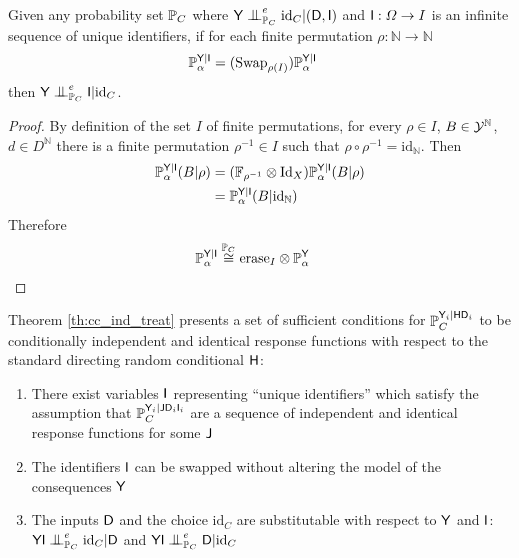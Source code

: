\begin{lemma}\label{lem:exch_to_ind}
Given any probability set $\mathbb{P}_C$ where $\RV{Y}\CI_{\prob{P}_C}^e \text{id}_C|(\RV{D},\RV{I})$ and $\mathsf{I}:\Omega\to I$ is an infinite sequence of unique identifiers, if for each finite permutation $\rho:\mathbb{N}\to \mathbb{N}$
\begin{align}
    \mathbb{P}_\alpha^{\mathsf{Y}|\mathsf{I}} &= (\text{Swap}_{\rho(I)})\mathbb{P}_\alpha^{\mathsf{Y}|\mathsf{I}}
\end{align}
then $\RV{Y}\CI_{\prob{P}_C}^e \RV{I}|\text{id}_C$.
\end{lemma}

\begin{proof}
By definition of the set $I$ of finite permutations, for every $\rho\in I$, $B\in\mathcal{Y}^{\mathbb{N}}$, $d\in D^{\mathbb{N}}$ there is a finite permutation $\rho^{-1}\in I$ such that $\rho\circ\rho^{-1}=\text{id}_{\mathbb{N}}$. Then
\begin{align}
    \mathbb{P}_\alpha^{\mathsf{Y}|\mathsf{I}}(B|\rho) &= (\mathbb{F}_{\rho^{-1}}\otimes \text{Id}_X )\mathbb{P}_\alpha^{\mathsf{Y}|\mathsf{I}}(B|\rho)\\
    &= \mathbb{P}_\alpha^{\mathsf{Y}|\mathsf{I}}(B|\text{id}_{\mathbb{N}})
\end{align}
Therefore
\begin{align}
    \mathbb{P}_\alpha^{\mathsf{Y}|\mathsf{I}} &\overset{\mathbb{P}_C}{\cong} \text{erase}_{I}\otimes \mathbb{P}_\alpha^{\mathsf{Y}}
\end{align}
\end{proof}

Theorem \ref{th:cc_ind_treat} presents a set of sufficient conditions for $\mathbb{P}_C^{\mathsf{Y}_i|\mathsf{H}\mathsf{D}_i}$ to be conditionally independent and identical response functions with respect to the standard directing random conditional $\mathsf{H}$:
\begin{enumerate}
    \item There exist variables $\mathsf{I}$ representing ``unique identifiers'' which satisfy the assumption that $\mathbb{P}_C^{\mathsf{Y}_i|\mathsf{J}\mathsf{D}_i\mathsf{I}_i}$ are a sequence of independent and identical response functions for some $\mathsf{J}$
    \item The identifiers $\mathsf{I}$ can be swapped without altering the model of the consequences $\mathsf{Y}$
    \item The inputs $\mathsf{D}$ and the choice $\text{id}_C$ are substitutable with respect to $\mathsf{Y}$ and $\mathsf{I}$: $\RV{YI}\CI^e_{\prob{P}_C} \text{id}_C|\RV{D}$ and $\RV{YI}\CI^e_{\prob{P}_C} \RV{D}|\text{id}_C$
\end{enumerate}

